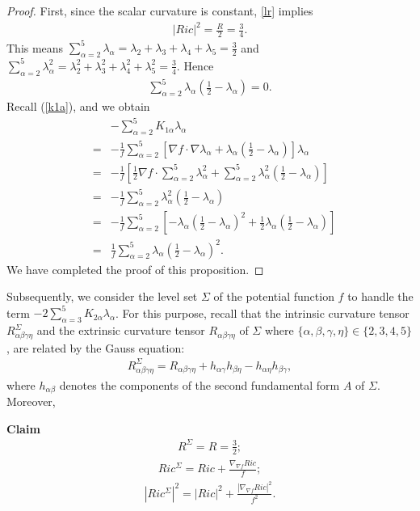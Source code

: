 \documentclass[12pt]{amsart}
\newcommand{\ba}{\begin{eqnarray}}
\newcommand{\ea}{\end{eqnarray}}
\newcommand{\ban}{\begin{eqnarray*}}
\newcommand{\ean}{\end{eqnarray*}}
\begin{document}
	\begin{proof}
		First, since the scalar curvature is constant, \eqref{lr} implies
		\ban
		|Ric|^2=\frac{R}{2}=\frac{3}{4}.
		\ean
		This means $\sum_{\alpha=2}^5\lambda_\alpha=\lambda_2+\lambda_3+\lambda_4+\lambda_5=\frac{3}{2}$ and $\sum_{\alpha=2}^5\lambda_\alpha^2=\lambda_2^2+\lambda_3^2+\lambda_4^2+\lambda_5^2=\frac{3}{4}$. Hence
		\ban
		\sum_{\alpha=2}^5\lambda_\alpha(\frac{1}{2}-\lambda_\alpha)=0.
		\ean
		Recall (\ref{k1a}), and we obtain
		\ban
		&&-\sum_{\alpha=2}^5K_{1\alpha}\lambda_\alpha\\
		&=&-\frac{1}{f}\sum_{\alpha=2}^5
		\left[ \nabla f\cdot \nabla \lambda_\alpha +\lambda_\alpha(\frac{1}{2}-\lambda_\alpha)\right]\lambda_\alpha\\
		&=&-\frac{1}{f}\left[ \frac{1}{2} \nabla f\cdot \sum_{\alpha=2}^5\lambda_\alpha^2
		+\sum_{\alpha=2}^5\lambda_\alpha^2(\frac{1}{2}-\lambda_\alpha) \right] \\
		&=&-\frac{1}{f}\sum_{\alpha=2}^5\lambda_\alpha^2(\frac{1}{2}-\lambda_\alpha) \\
		&=&-\frac{1}{f}\sum_{\alpha=2}^5\left[- \lambda_\alpha(\frac{1}{2}-\lambda_\alpha)^2+\frac{1}{2}\lambda_\alpha(\frac{1}{2}-\lambda_\alpha) \right] \\
		&=&\frac{1}{f}\sum_{\alpha=2}^5 \lambda_\alpha(\frac{1}{2}-\lambda_\alpha)^2.
		\ean
		We have completed the proof of this proposition.
		
	\end{proof}
	
	
	Subsequently, we consider the level set $\Sigma$ of the potential function $f$ to handle the term $-2\sum_{\alpha=3}^5 K_{2\alpha}\lambda_\alpha$. For this purpose,
	recall that the intrinsic curvature tensor $R^{\Sigma}_{\alpha \beta \gamma \eta }$ and the extrinsic curvature tensor $R_{\alpha \beta \gamma \eta }$ of ${\Sigma}$ where $\{\alpha,\beta,\gamma,\eta\}\in\{2,3,4,5\}$, are related by the Gauss equation:
	\ban
	R^{\Sigma}_{\alpha \beta \gamma \eta }=R_{\alpha \beta \gamma \eta }+h_{\alpha \gamma}h_{\beta \eta}-h_{\alpha \eta }h_{\beta \gamma},
	\ean
	where $h_{\alpha \beta }$ denotes the components of the second fundamental form $A$ of ${\Sigma}$. Moreover,
	
	\smallskip
	\textbf{Claim}
	\ba\label{rsigma}
	R^{\Sigma}=R=\frac{3}{2};
	\ea
	\ba\label{ricsigma}
	Ric^{\Sigma}=Ric+\frac{\nabla_{\nabla f} Ric}{f};
	\ea
	\ba\label{ricsigma'}
	|Ric^{\Sigma}|^2=|Ric|^2+\frac{|\nabla_{\nabla f} Ric|^2}{f^2}.
	\ea	
	
\end{document}
